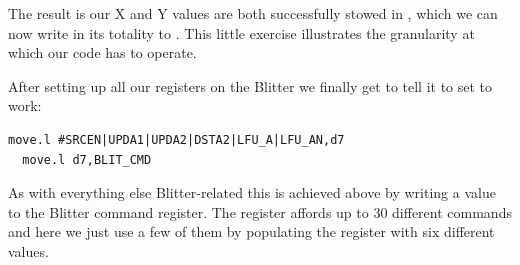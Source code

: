 \begin{figure}[H]
  {
    \setlength{\tabcolsep}{3.0pt}
    \setlength\cmidrulewidth{\lightrulewidth} %
    \begin{adjustbox}{width=3cm,center}
    \end{adjustbox}
  }
\end{figure}
\vspace{-0.5cm}
 The result is our X and Y values are both successfully stowed in , which we can now write in its totality to
. This little exercise illustrates the granularity at which our code has to operate. 

After setting up all our registers on the Blitter we finally get to tell it to set to work:

\begin{lstlisting}[escapechar=\%]
  move.l #SRCEN|UPDA1|UPDA2|DSTA2|LFU_A|LFU_AN,d7
  move.l d7,BLIT_CMD
\end{lstlisting}

As with everything else Blitter-related this is achieved above by writing a value to the Blitter command register. The register
affords up to 30 different commands and here we just use a few of them by populating the register with six different values.

